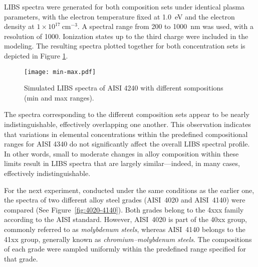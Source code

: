 \documentclass[12pt,a4paper]{article}
\begin{document}
	
	LIBS spectra were generated for both composition sets under identical plasma parameters, with the electron temperature fixed at 1.0~eV and the electron density at $1 \times 10^{17}~\text{cm}^{-3}$. A spectral range from 200 to 1000~nm was used, with a resolution of 1000. Ionization states up to the third charge were included in the modeling. The resulting spectra plotted together for both concentration sets is depicted in Figure \ref{fig:min-max}.
	
	
	
	\begin{figure}[h!]
		\centering
		\texttt{[image: min-max.pdf]}
		\caption{Simulated LIBS spectra of AISI 4240 with different sompositions (min and max ranges).}
		\label{fig:min-max}
	\end{figure} 
	The spectra corresponding to the different composition sets appear to be nearly indistinguishable, effectively overlapping one another. This observation indicates that variations in elemental concentrations within the predefined compositional ranges for AISI 4340 do not significantly affect the overall LIBS spectral profile. In other words, small to moderate changes in alloy composition within these limits result in LIBS spectra that are largely similar—indeed, in many cases, effectively indistinguishable.
	
	
	
	For the next experiment, conducted under the same conditions as the earlier one, the spectra of two different alloy steel grades (AISI~4020 and AISI~4140) were compared (See Figure~\ref{fig:4020-4140}). Both grades belong to the 4xxx family according to the AISI standard. However, AISI~4020 is part of the 40xx group, commonly referred to as \emph{molybdenum steels}, whereas AISI~4140 belongs to the 41xx group, generally known as \emph{chromium--molybdenum steels}. The compositions of each grade were sampled uniformly within the predefined range specified for that grade.
	
\end{document}
